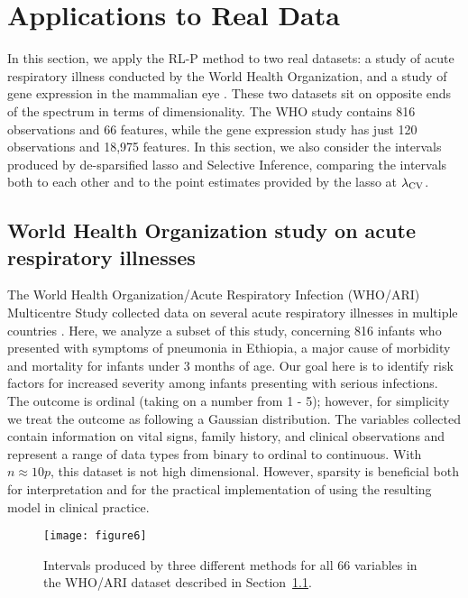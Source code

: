 \section{Applications to Real Data}\label{Sec:RDA}

In this section, we apply the RL-P method to two real datasets: a study of acute respiratory illness conducted by the World Health Organization, and a study of gene expression in the mammalian eye \citep{Scheetz2006}. These two datasets sit on opposite ends of the spectrum in terms of dimensionality. The WHO study contains 816 observations and 66 features, while the gene expression study has just 120 observations and 18,975 features. In this section, we also consider the intervals produced by de-sparsified lasso and Selective Inference, comparing the intervals both to each other and to the point estimates provided by the lasso at $\lambda_{\textrm{CV}}$.

\subsection{World Health Organization study on acute respiratory illnesses}\label{Sec:WHO-ARI}

The World Health Organization/Acute Respiratory Infection (WHO/ARI) Multicentre Study collected data on several acute respiratory illnesses in multiple countries \citep{Harrell1998}. Here, we analyze a subset of this study, concerning 816 infants who presented with symptoms of pneumonia in Ethiopia, a major cause of morbidity and mortality for infants under 3 months of age. Our goal here is to identify risk factors for increased severity among infants presenting with serious infections. The outcome is ordinal (taking on a number from 1 - 5); however, for simplicity we treat the outcome as following a Gaussian distribution. The variables collected contain information on vital signs, family history, and clinical observations and represent a range of data types from binary to ordinal to continuous. With $n \approx 10p$, this dataset is not high dimensional. However, sparsity is beneficial both for interpretation and for the practical implementation of using the resulting model in clinical practice.

\begin{figure}[htb!]
  \begin{center}
    \texttt{[image: figure6]}
    \caption{\label{fig:6} Intervals produced by three different methods for all 66 variables in the WHO/ARI dataset described in Section~\ref{Sec:WHO-ARI}.}
  \end{center}
\end{figure}

